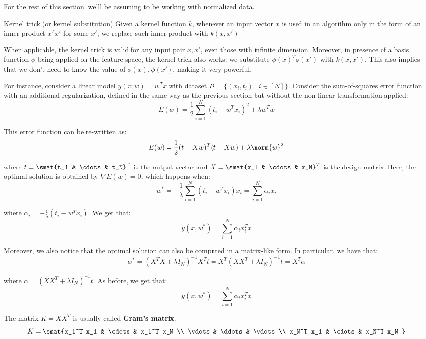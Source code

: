 \documentclass[a4paper, 12pt]{report}
\begin{document}
    For the rest of this section, we'll be assuming to be working with normalized data.

    \begin{framedprop}{Kernel trick (or kernel substitution)}
        Given a kernel function $k$, whenever an input vector $x$ is used in an algorithm only in the form of an inner product $x^Tx'$ for some $x'$, we replace such inner product with $k(x,x')$
    \end{framedprop}

    When applicable, the kernel trick is valid for any input pair $x,x'$, even those with infinite dimension. Moreover, in presence of a basis function $\phi$ being applied on the feature space, the kernel trick also works: we substitute $\phi(x)^T \phi(x')$ with $k(x,x')$. This also implies that we don't need to know the value of $\phi(x), \phi(x')$, making it very powerful.

    For instance, consider a linear model $y({x}; {w}) = {w}^T {x}$ with dataset $D = \{(x_i, t_i) \mid i \in [N]\}$. Consider the sum-of-squares error function with an additional regularization, defined in the same way as the previous section but without the non-linear transformation applied:
    \[E({w}) = \frac{1}{2} \sum_{i = 1}^N (t_i - {w}^T x_i)^2 + \lambda {w}^T {w}\]

    This error function can be re-written as:
    \[E({w}) = \frac{1}{2}  ({t}-X {w})^T({t}-X {w}) + \lambda \norm{w}^2\]
    
    where ${t} = \smat{t_1 & \cdots & t_N}^T$ is the output vector and $X = \smat{x_1 & \cdots & x_N}^T$ is the design matrix. Here, the optimal solution is obtained by $\nabla E({w}) = 0$, which happens when:
    \[{w^*} = -\frac{1}{\lambda} \sum_{i = 1}^N (t_i - {w}^T {x_i}) {x_i} = \sum_{i = 1}^N \alpha_i x_i\]

    where $\alpha_i = -\frac{1}{\lambda}(t_i - {w}^T {x_i})$. We get that:
    \[y({x}, {w^*}) = \sum_{i = 1}^N \alpha_i x_i^T x\]

    Moreover, we also notice that the optimal solution can also be computed in a matrix-like form. In particular, we have that:
    \[{w^*} = (X^TX + \lambda I_N)^{-1} X^T  t = X^T (XX^T + \lambda I_N)^{-1}  t = X^T \alpha\]

    where $\alpha = (XX^T + \lambda I_N)^{-1} {t}$. As before, we get that:
    \[y({x}, {w^*}) = \sum_{i = 1}^N \alpha_i x_i^T x\]

    The matrix $K = XX^T$ is usually called \textbf{Gram's matrix}.
    \[K = \smat{x_1^T x_1 & \cdots & x_1^T x_N \\
    \vdots & \ddots & \vdots \\
    x_N^T x_1 & \cdots & x_N^T x_N }\]
\end{document}
